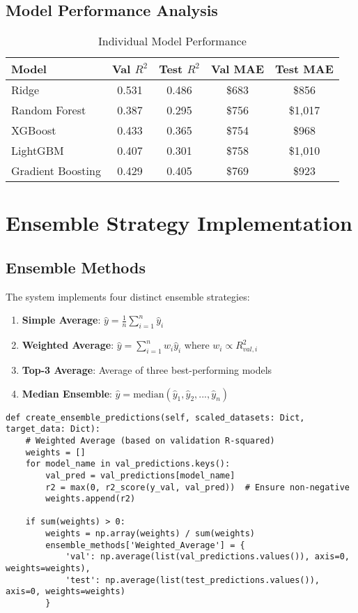 \documentclass[12pt,a4paper]{article}
\begin{document}
\subsection{Model Performance Analysis}

\begin{table}[h]
\centering
\begin{tabular}{@{}lcccc@{}}
\toprule
\textbf{Model} & \textbf{Val $R^2$} & \textbf{Test $R^2$} & \textbf{Val MAE} & \textbf{Test MAE} \\
\midrule
Ridge & 0.531 & 0.486 & \$683 & \$856 \\
Random Forest & 0.387 & 0.295 & \$756 & \$1,017 \\
XGBoost & 0.433 & 0.365 & \$754 & \$968 \\
LightGBM & 0.407 & 0.301 & \$758 & \$1,010 \\
Gradient Boosting & 0.429 & 0.405 & \$769 & \$923 \\
\bottomrule
\end{tabular}
\caption{Individual Model Performance}
\end{table}

\section{Ensemble Strategy Implementation}

\subsection{Ensemble Methods}

The system implements four distinct ensemble strategies:

\begin{enumerate}
    \item \textbf{Simple Average}: $\hat{y} = \frac{1}{n}\sum_{i=1}^{n}\hat{y}_i$
    \item \textbf{Weighted Average}: $\hat{y} = \sum_{i=1}^{n}w_i\hat{y}_i$ where $w_i \propto R^2_{val,i}$
    \item \textbf{Top-3 Average}: Average of three best-performing models
    \item \textbf{Median Ensemble}: $\hat{y} = \text{median}(\hat{y}_1, \hat{y}_2, ..., \hat{y}_n)$
\end{enumerate}

\begin{lstlisting}[caption=Ensemble Strategy Implementation]
def create_ensemble_predictions(self, scaled_datasets: Dict, target_data: Dict):
    # Weighted Average (based on validation R-squared)
    weights = []
    for model_name in val_predictions.keys():
        val_pred = val_predictions[model_name]
        r2 = max(0, r2_score(y_val, val_pred))  # Ensure non-negative
        weights.append(r2)
    
    if sum(weights) > 0:
        weights = np.array(weights) / sum(weights)
        ensemble_methods['Weighted_Average'] = {
            'val': np.average(list(val_predictions.values()), axis=0, weights=weights),
            'test': np.average(list(test_predictions.values()), axis=0, weights=weights)
        }
\end{lstlisting}
\end{document}

